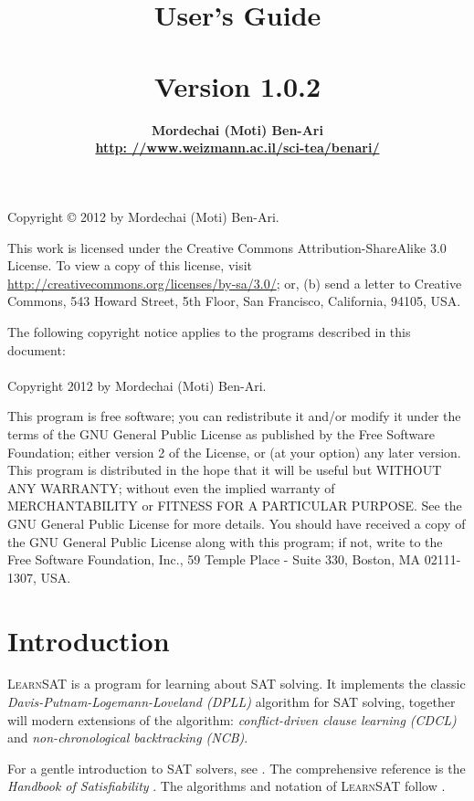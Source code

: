 \documentclass[11pt]{article}
\author{\bfseries Mordechai (Moti) Ben-Ari\\\url{http: //www.weizmann.ac.il/sci-tea/benari/}}
\title{\bfseries \ls\\\mbox{}\\
\bfseries\large User's Guide\\\mbox{}\\
\bfseries\normalsize Version 1.0.2}
\newcommand*{\ls}{\textsc{LearnSAT}}
\begin{document}
\maketitle
\thispagestyle{empty}

\vfill

\begin{center}
Copyright \copyright{} 2012 by Mordechai (Moti) Ben-Ari.
\end{center}
This work is licensed under the Creative Commons Attribution-ShareAlike 3.0
License. To view a copy of this license, visit
\url{http://creativecommons.org/licenses/by-sa/3.0/}; or, (b) send a letter
to Creative Commons, 543 Howard Street, 5th Floor, San Francisco,
California, 94105, USA.

\bigskip

 
\begin{center}
The following copyright notice applies to the programs described in this
document:\mbox{}\\\mbox{}\\
Copyright 2012 by Mordechai (Moti) Ben-Ari.
\end{center}

This program is free software; you can redistribute it and/or
modify it under the terms of the GNU General Public License
as published by the Free Software Foundation; either version 2
of the License, or (at your option) any later version.
This program is distributed in the hope that it will be useful
but WITHOUT ANY WARRANTY; without even the implied warranty of
MERCHANTABILITY or FITNESS FOR A PARTICULAR PURPOSE.
See the GNU General Public License for more details.
You should have received a copy of the GNU General Public License
along with this program; if not, write to the Free Software
Foundation, Inc., 59 Temple Place - Suite 330, Boston, MA
02111-1307, USA.

\newpage

\section{Introduction}

\ls{} is a program for learning about SAT solving. It implements the
classic \emph{Davis-Putnam-Logemann-Loveland (DPLL)} algorithm for SAT
solving, together will modern extensions of the algorithm:
\emph{conflict-driven clause learning (CDCL)} and
\emph{non-chronological backtracking (NCB)}.

For a gentle introduction to SAT solvers, see \cite[Chapter~6]{mlcs}.
The comprehensive reference is the \emph{Handbook of Satisfiability}
\cite{SAT}. The algorithms and notation of \ls{} follow \cite{mlm}.
\end{document}
